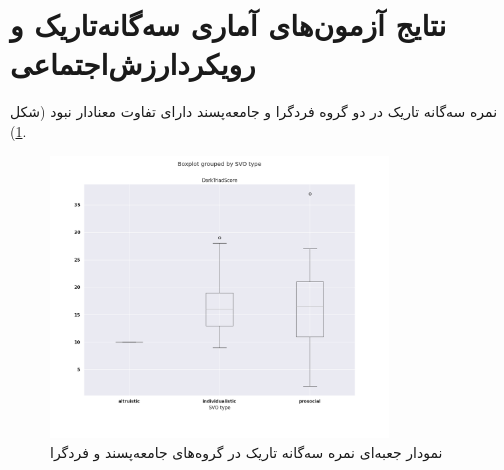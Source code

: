 
\section{نتایج آزمون‌های آماری سه‌گانه‌تاریک و رویکرد‌ارزش‌اجتماعی}

نمره سه‌گانه تاریک در دو گروه  فرد‌گرا و جامعه‌پسند دارای تفاوت معنادار نبود
(شکل
\ref{fig:BoxPlotDTRSVOTypeProsocialBoxPlotDTRSVOTypeIndivisualistTTESTIndPValueReport}).

\begin{figure}[htpb]
    \centering
    \includegraphics[width=0.8\textwidth]{./img/BoxPlotDTRSVOTypeProsocialBoxPlotDTRSVOTypeIndivisualistTTESTIndPValueReport.png}
    \caption{نمودار جعبه‌ای نمره سه‌گانه تاریک در گروه‌های جامعه‌پسند و فرد‌گرا}
    \label{fig:BoxPlotDTRSVOTypeProsocialBoxPlotDTRSVOTypeIndivisualistTTESTIndPValueReport}
\end{figure}

